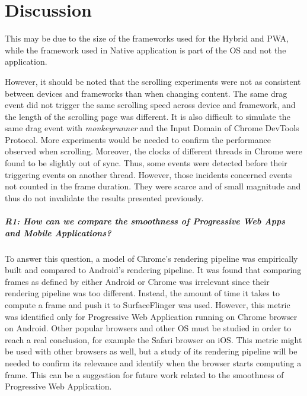 
\chapter{Discussion}

This may be due to the size of the frameworks used for the Hybrid and PWA, while the framework used in Native application is part of the OS and not the application.

However, it should be noted that the scrolling experiments were not as consistent between devices and frameworks than when changing content. The same drag event did not trigger the same scrolling speed across device and framework, and the length of the scrolling page was different. It is also difficult to simulate the same drag event with \textit{monkeyrunner} and the Input Domain of Chrome DevTools Protocol. More experiments would be needed to confirm the performance observed when scrolling. Moreover, the clocks of different threads in Chrome were found to be slightly out of sync. Thus, some events were detected before their triggering events on another thread. However, those incidents concerned events not counted in the frame duration. They were scarce and of small magnitude and thus do not invalidate the results presented previously.


\paragraph{R1: How can we compare the smoothness of Progressive Web Apps and Mobile Applications?}
To answer this question, a model of Chrome's rendering pipeline was empirically built and compared to Android's rendering pipeline. It was found that comparing frames as defined by either Android or Chrome was irrelevant since their rendering pipeline was too different. Instead, the amount of time it takes to compute a frame and push it to SurfaceFlinger was used. \newline
However, this metric was identified only for Progressive Web Application running on Chrome browser on Android. Other popular browsers and other OS must be studied in order to reach a real conclusion, for example the Safari browser on iOS. This metric might be used with other browsers as well, but a study of its rendering pipeline will be needed to confirm its relevance and identify when the browser starts computing a frame. This can be a suggestion for future work related to the smoothness of Progressive Web Application. 

